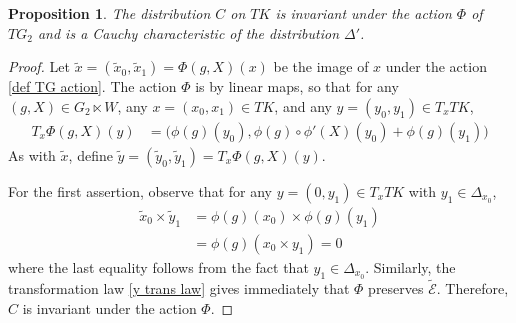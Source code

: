 \documentclass[11pt,letterpaper]{amsart}
\newtheorem{prop}[theorem]{Proposition}
\numberwithin{equation}{section}
\begin{document}
\begin{prop}
    \label{prop: C is Cauchy Char}
    The distribution $C$ on $TK$ is invariant under the action $\Phi$ of $TG_2$ and is a Cauchy characteristic of the distribution $\Delta'$.
\end{prop}
\begin{proof}
 Let $\tilde x = (\tilde x_0, \tilde x_1) = \Phi(g,X)(x)$ be the image of $x$ under the action \eqref{def TG action}. The action $\Phi$ is by linear maps, so that for any $(g,X)\in G_2\ltimes W$, any $x=(x_0,x_1)\in TK$, and any $y=(y_0, y_1)\in T_xTK$,
\begin{align}
    \label{y trans law}
    T_x\Phi(g,X)(y) & = \Big(\phi(g)(y_0),\phi(g)\circ\phi'(X)(y_0) + \phi(g)(y_1)\Big)
\end{align}
As with $\tilde x$, define $\tilde y = (\tilde y_0,\tilde y_1) = T_x\Phi(g,X)(y)$.

For the first assertion, observe that for any $y=(0,y_1)\in T_xTK$ with $y_1\in \Delta_{x_0}$, 
\begin{align}
    \tilde x_0\times \tilde y_1 & = \phi(g)(x_0)\times \phi(g)(y_1)
    \\
    & = \phi(g)(x_0\times y_1) = 0
\end{align}
where the last equality follows from the fact that $y_1\in \Delta_{x_0}$. Similarly, the transformation law \eqref{y trans law} gives immediately that $\Phi$ preserves $\tilde{\mathcal{E}}$. Therefore, $C$ is invariant under the action $\Phi$.


\end{proof}
\end{document}

